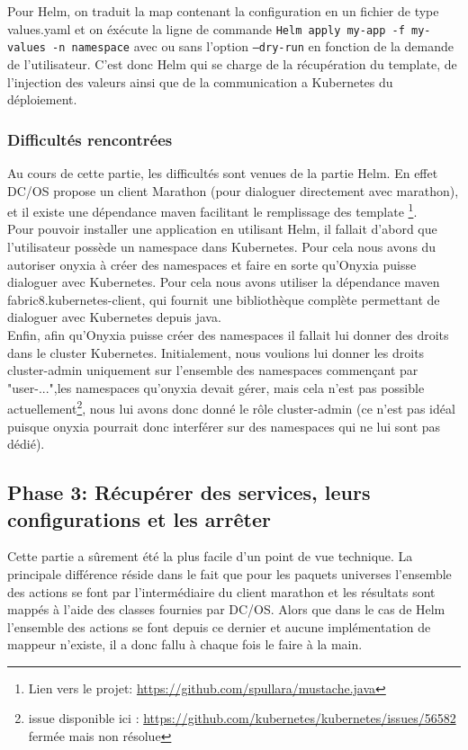 \documentclass[11pt,fleqn]{book} %
\begin{document}
Pour Helm, on traduit la map contenant la configuration en un fichier de type values.yaml et on éxécute la ligne de commande \texttt{Helm apply my-app -f my-values -n namespace} avec ou sans l'option \texttt{--dry-run} en fonction de la demande de l'utilisateur. C'est donc Helm qui se charge de la récupération du template, de l'injection des valeurs ainsi que de la communication a Kubernetes du déploiement.

\subsubsection{Difficultés rencontrées}
Au cours de cette partie, les difficultés sont venues de la partie Helm. En effet DC/OS propose un client Marathon (pour dialoguer directement avec marathon), et il existe une dépendance maven facilitant le remplissage des template \footnote{Lien vers le projet: \url{https://github.com/spullara/mustache.java}}.\\
Pour pouvoir installer une application en utilisant Helm, il fallait d'abord que l'utilisateur possède un namespace dans Kubernetes. Pour cela nous avons du autoriser onyxia à créer des namespaces et faire en sorte qu'Onyxia puisse dialoguer avec Kubernetes. Pour cela nous avons utiliser la dépendance maven fabric8.kubernetes-client, qui fournit une bibliothèque complète permettant de dialoguer avec Kubernetes depuis java. \\
Enfin, afin qu'Onyxia puisse créer des namespaces il fallait lui donner des droits dans le cluster Kubernetes. Initialement, nous voulions lui donner les droits cluster-admin uniquement sur l'ensemble des namespaces commençant par "user-...",les namespaces qu'onyxia devait gérer, mais cela n'est pas possible actuellement\footnote{issue disponible ici : \url{https://github.com/kubernetes/kubernetes/issues/56582} fermée mais non résolue}, nous lui avons donc donné le rôle cluster-admin (ce n'est pas idéal puisque onyxia pourrait donc interférer sur des namespaces qui ne lui sont pas dédié).

\subsection{Phase 3: Récupérer des services, leurs configurations et les arrêter}
Cette partie a sûrement été la plus facile d'un point de vue technique. La principale différence réside dans le fait que pour les paquets universes l'ensemble des actions se font par l'intermédiaire du client marathon  et les résultats sont mappés à l'aide des classes fournies par DC/OS. Alors que dans le cas de Helm l'ensemble des actions se font depuis ce dernier et aucune implémentation de mappeur n'existe, il a donc fallu à chaque fois le faire à la main.\\
\end{document}
